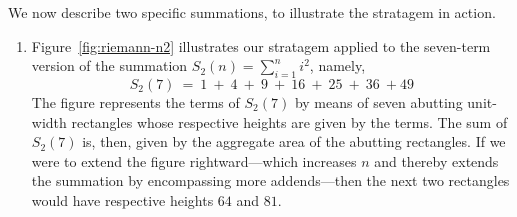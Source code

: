\bigskip

\noindent
We now describe two specific summations, to illustrate the stratagem in action.

\begin{enumerate}
\item
Figure~\ref{fig:riemann-n2} illustrates our stratagem applied to the seven-term version of the summation $S_2(n) = \sum_{i=1}^n i^2$, namely,
\[ S_2(7) \ = \ 1 \ + \ 4 \ + \ 9 \ + \ 16 \ + \ 25 \ + \ 36 \ +  49 \]
The figure represents the terms of $S_2(7)$ by means of seven abutting unit-width rectangles whose respective heights are given by the terms.  The sum of $S_2(7)$ is, then, given by the aggregate area of the abutting rectangles.  If we were to extend the figure rightward---which increases $n$ and thereby extends the summation by encompassing more addends---then the next two rectangles would have respective heights $64$ and $81$.

\smallskip


\end{enumerate}

